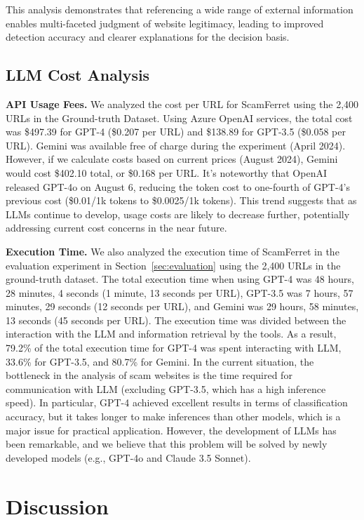 \documentclass[runningheads]{llncs}
\begin{document}
This analysis demonstrates that referencing a wide range of external information enables multi-faceted judgment of website legitimacy, leading to improved detection accuracy and clearer explanations for the decision basis.

\subsection{LLM Cost Analysis}
\noindent\textbf{API Usage Fees.}
We analyzed the cost per URL for ScamFerret using the 2,400 URLs in the Ground-truth Dataset.
Using Azure OpenAI services, the total cost was \$497.39 for GPT-4 (\$0.207 per URL) and \$138.89 for GPT-3.5 (\$0.058 per URL).
Gemini was available free of charge during the experiment (April 2024).
However, if we calculate costs based on current prices (August 2024), Gemini would cost \$402.10 total, or \$0.168 per URL.
It's noteworthy that OpenAI released GPT-4o on August 6, reducing the token cost to one-fourth of GPT-4's previous cost (\$0.01/1k tokens to \$0.0025/1k tokens).
This trend suggests that as LLMs continue to develop, usage costs are likely to decrease further, potentially addressing current cost concerns in the near future.

\noindent\textbf{Execution Time.}
We also analyzed the execution time of ScamFerret in the evaluation experiment in Section~\ref{sec:evaluation} using the 2,400 URLs in the ground-truth dataset.
The total execution time when using GPT-4 was 48 hours, 28 minutes, 4 seconds (1 minute, 13 seconds per URL), GPT-3.5 was 7 hours, 57 minutes, 29 seconds (12 seconds per URL), and Gemini was 29 hours, 58 minutes, 13 seconds (45 seconds per URL).
The execution time was divided between the interaction with the LLM and information retrieval by the tools.
As a result, 79.2\% of the total execution time for GPT-4 was spent interacting with LLM, 33.6\% for GPT-3.5, and 80.7\% for Gemini.
In the current situation, the bottleneck in the analysis of scam websites is the time required for communication with LLM (excluding GPT-3.5, which has a high inference speed).
In particular, GPT-4 achieved excellent results in terms of classification accuracy, but it takes longer to make inferences than other models, which is a major issue for practical application.
However, the development of LLMs has been remarkable, and we believe that this problem will be solved by newly developed models (e.g., GPT-4o and Claude 3.5 Sonnet).

\section{Discussion}
\end{document}
